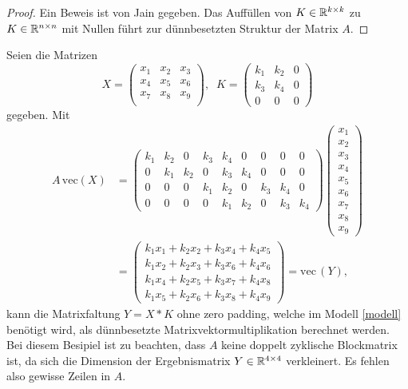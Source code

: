 \begin{proof}
    Ein Beweis ist von Jain \cite{jain1989fundamentals} gegeben. Das Auffüllen von $K \in \mathbb{R}^{k \times k}$ zu $K \in \mathbb{R}^{n \times n}$ mit Nullen führt zur dünnbesetzten Struktur der Matrix $A$. 
\end{proof}
\begin{bsp}
    \label{bsp:Kzeropad}
    Seien die Matrizen
    \begin{equation*}
        X=\begin{pmatrix}
            x_1 & x_2 &x_3 \\
            x_4 & x_5 &x_6 \\
            x_7 & x_8 &x_9 \\
        \end{pmatrix}, \; \;
        K=\begin{pmatrix}
            k_1 & k_2 &0\\
            k_3 &k_4 &0 \\
            0 &0 &0
        \end{pmatrix}
    \end{equation*}
    gegeben. Mit 
    \begin{align*}
    A \, \mathrm{vec}(X) &=    
    \begin{pmatrix}
        k_1 & k_2 & 0 &k_3 &k_4 &0 &0 &0 &0 \\
        0 & k_1 & k_2 &0 &k_3 &k_4 &0 &0 &0 \\
        0 & 0 & 0 &k_1 &k_2 &0 &k_3 &k_4 &0 \\
        0 & 0 & 0 &0 &k_1 &k_2 &0 &k_3 &k_4 
    \end{pmatrix}
    \begin{pmatrix}
        x_1 \\
        x_2 \\
        x_3 \\
        x_4 \\
        x_5 \\
        x_6 \\
        x_7 \\
        x_8 \\
        x_9
    \end{pmatrix} \\
    &=\begin{pmatrix}
        k_1 x_1+ k_2 x_2 +k_3 x_4 +k_4 x_5 \\
        k_1 x_2+ k_2 x_3 +k_3 x_6 +k_4 x_6 \\
        k_1 x_4+ k_2 x_5 +k_3 x_7 +k_4 x_8 \\
        k_1 x_5+ k_2 x_6 +k_3 x_8 +k_4 x_9 
    \end{pmatrix}=\mathrm{vec} \, (Y),
\end{align*}
kann die Matrixfaltung $Y = X \ast K$ ohne zero padding, welche im Modell \ref{modell} benötigt wird, als dünnbesetzte Matrixvektormultiplikation berechnet werden. Bei diesem Besipiel ist zu beachten, dass $A$ keine doppelt zyklische Blockmatrix ist, da sich die Dimension der Ergebnismatrix $ Y \in \mathbb{R}^{ 4 \times 4}$ verkleinert. Es fehlen also gewisse Zeilen in $A$.
\end{bsp}
